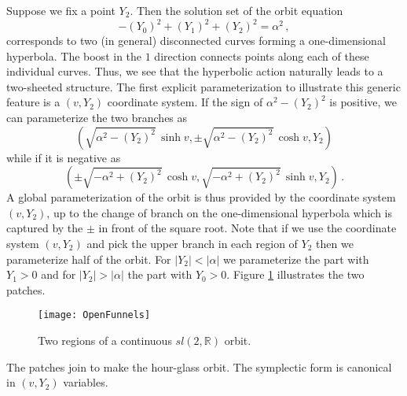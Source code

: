 \documentclass[12pt]{article}
\numberwithin{equation}{section}
\newcommand{\be}{\begin{equation}}
\newcommand{\ee}{\end{equation}}
\numberwithin{equation}{section}
\numberwithin{table}{section}\setlength{\multlinegap}{25pt}
\begin{document}
Suppose we fix a point $Y_2$. Then the solution set of the orbit equation 
\begin{equation}
-(Y_0)^2 + (Y_1)^2 + (Y_2)^2 = \alpha^2 \,,
\end{equation}
corresponds to two (in general) disconnected curves forming a one-dimensional hyperbola. 
The boost in the $1$ direction connects points along each of these individual curves. Thus, we see that the hyperbolic action naturally leads to a two-sheeted structure. The first explicit parameterization to illustrate this generic feature is a $(v,Y_2)$ coordinate system. If the sign of $\alpha^2-(Y_2)^2$ is positive, we can parameterize the two branches as 
\be
\left(\sqrt{\alpha^2-(Y_2)^2}\, \sinh v,\pm \sqrt{\alpha^2-(Y_2)^2}\, \cosh v, Y_2 \right) 
\ee
 while if it is negative as  
 \be
 \left(\pm \sqrt{-\alpha^2+(Y_2)^2}\, \cosh v, \sqrt{-\alpha^2+(Y_2)^2}\, \sinh v, Y_2 \right) \, .
 \ee
 A global parameterization of the orbit is thus provided by the coordinate system $(v,Y_2)$, up to the change of branch on the one-dimensional hyperbola which is captured by the $\pm$ in front of the square root.  
 Note that if we use the coordinate system $(v,Y_2)$ and pick the upper branch in each region of $Y_2$ then we parameterize half of the orbit. For $|Y_2| < |\alpha|$ we parameterize the part with $Y_1>0$ and for $|Y_2| > |\alpha|$ the part with $Y_0>0$.
 Figure \ref{OpenFunnels} illustrates the two patches. \begin{figure}
\begin{center}
\texttt{[image: OpenFunnels]}
\end{center}
\caption{Two regions of a continuous $sl(2,\mathbb{R})$ orbit.}
\label{OpenFunnels}
\end{figure}  The patches join to make the  hour-glass orbit.
 The symplectic form is canonical in $(v,Y_2)$ variables. 
\end{document}

